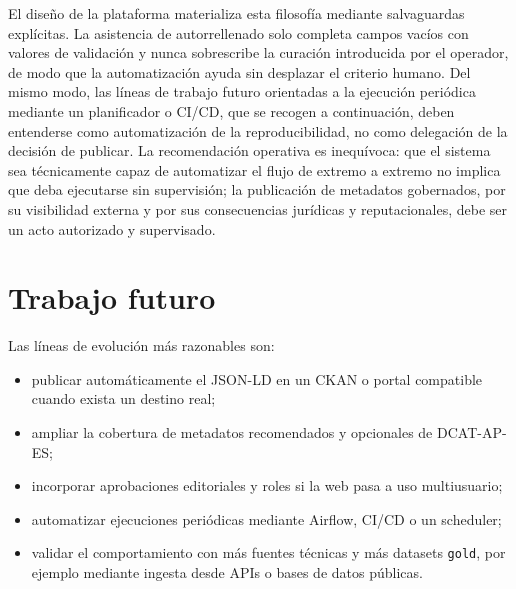 El diseño de la plataforma materializa esta filosofía mediante salvaguardas explícitas. La asistencia de autorrellenado solo completa campos vacíos con valores de validación y nunca sobrescribe la curación introducida por el operador, de modo que la automatización ayuda sin desplazar el criterio humano. Del mismo modo, las líneas de trabajo futuro orientadas a la ejecución periódica mediante un planificador o CI/CD, que se recogen a continuación, deben entenderse como automatización de la reproducibilidad, no como delegación de la decisión de publicar. La recomendación operativa es inequívoca: que el sistema sea técnicamente capaz de automatizar el flujo de extremo a extremo no implica que deba ejecutarse sin supervisión; la publicación de metadatos gobernados, por su visibilidad externa y por sus consecuencias jurídicas y reputacionales, debe ser un acto autorizado y supervisado.

\section{Trabajo futuro}

Las líneas de evolución más razonables son:

\begin{itemize}
  \item publicar automáticamente el JSON-LD en un CKAN o portal compatible cuando exista un destino real;
  \item ampliar la cobertura de metadatos recomendados y opcionales de DCAT-AP-ES;
  \item incorporar aprobaciones editoriales y roles si la web pasa a uso multiusuario;
  \item automatizar ejecuciones periódicas mediante Airflow, CI/CD o un scheduler;
  \item validar el comportamiento con más fuentes técnicas y más datasets \texttt{gold}, por ejemplo mediante ingesta desde APIs o bases de datos públicas.
\end{itemize}
